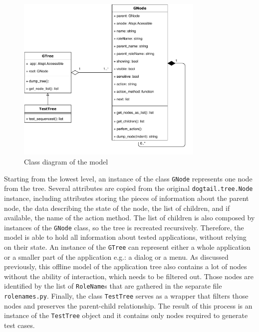 \begin{figure}[hbt]
	\centering
	\includegraphics[width=0.8\textwidth,clip]{obrazky-figures/tree_diagram.pdf}
	\caption{Class diagram of the model}
	\label{tree_diagram}
\end{figure}

Starting from the lowest level, an instance of the class \texttt{GNode} represents one node from the tree. Several attributes are copied from the original \texttt{dogtail.tree.Node} instance, including attributes storing the pieces of information about the parent node, the data describing the state of the node, the list of children, and if available, the name of the action method. The list of children is also composed by instances of the \texttt{GNode} class, so the tree is recreated recursively. Therefore, the model is able to hold all information about tested applications, without relying on their state. An instance of the \texttt{GTree} can represent either a whole application or a smaller part of the application e.g.: a dialog or a menu. As discussed previously, this offline model of the application tree also contains a lot of nodes without the ability of interaction, which needs to be filtered out. Those nodes are identified by the list of \texttt{RoleName}s that are gathered in the separate file \texttt{rolenames.py}. Finally, the class \texttt{TestTree} serves as a wrapper that filters those nodes and preserves the parent-child relationship. The result of this process is an instance of the \texttt{TestTree} object and it contains only nodes required to generate test cases. 

\newpage
